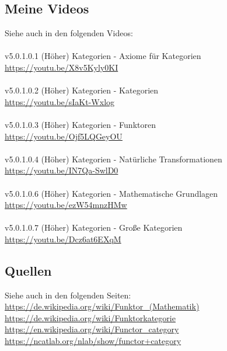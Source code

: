 \documentclass[a4paper]{amsart}
\theoremstyle{definition}
\begin{document}
\subsection*{Meine Videos}
Siehe auch in den folgenden Videos:\\
\\
v5.0.1.0.1 (Höher) Kategorien - Axiome für Kategorien\\
\url{https://youtu.be/X8v5Kyly0KI}\\
\\
v5.0.1.0.2 (Höher) Kategorien - Kategorien\\
\url{https://youtu.be/sIaKt-Wxlog}\\
\\
v5.0.1.0.3 (Höher) Kategorien - Funktoren\\
\url{https://youtu.be/Ojf5LQGeyOU}\\
\\
v5.0.1.0.4 (Höher) Kategorien - Natürliche Transformationen\\
\url{https://youtu.be/IN7Qa-SwlD0}\\
\\
v5.0.1.0.6 (Höher) Kategorien - Mathematische Grundlagen\\
\url{https://youtu.be/ezW54mnzHMw}\\
\\
v5.0.1.0.7 (Höher) Kategorien - Große Kategorien\\
\url{https://youtu.be/Dcz6at6EXqM}


\subsection*{Quellen}
Siehe auch in den folgenden Seiten:\\
\url{https://de.wikipedia.org/wiki/Funktor_(Mathematik)}\\
\url{https://de.wikipedia.org/wiki/Funktorkategorie}\\
\url{https://en.wikipedia.org/wiki/Functor_category}\\
\url{https://ncatlab.org/nlab/show/functor+category}

\end{document}

